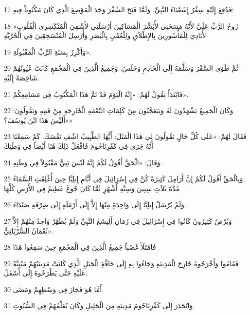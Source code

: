 \par 17 فَدُفِعَ إِلَيْهِ سِفْرُ إِشَعْيَاءَ النَّبِيِّ. وَلَمَّا فَتَحَ السِّفْرَ وَجَدَ الْمَوْضِعَ الَّذِي كَانَ مَكْتُوباً فِيهِ:
\par 18 «رُوحُ الرَّبِّ عَلَيَّ لأَنَّهُ مَسَحَنِي لأُبَشِّرَ الْمَسَاكِينَ أَرْسَلَنِي لأَشْفِيَ الْمُنْكَسِرِي الْقُلُوبِ لأُنَادِيَ لِلْمَأْسُورِينَ بِالإِطْلاَقِ ولِلْعُمْيِ بِالْبَصَرِ وَأُرْسِلَ الْمُنْسَحِقِينَ فِي الْحُرِّيَّةِ
\par 19 وَأَكْرِزَ بِسَنَةِ الرَّبِّ الْمَقْبُولَةِ».
\par 20 ثُمَّ طَوَى السِّفْرَ وَسَلَّمَهُ إِلَى الْخَادِمِ وَجَلَسَ. وَجَمِيعُ الَّذِينَ فِي الْمَجْمَعِ كَانَتْ عُيُونُهُمْ شَاخِصَةً إِلَيْهِ.
\par 21 فَابْتَدَأَ يَقُولُ لَهُمْ: «إِنَّهُ الْيَوْمَ قَدْ تَمَّ هَذَا الْمَكْتُوبُ فِي مَسَامِعِكُمْ».
\par 22 وَكَانَ الْجَمِيعُ يَشْهَدُونَ لَهُ وَيَتَعَجَّبُونَ مِنْ كَلِمَاتِ النِّعْمَةِ الْخَارِجَةِ مِنْ فَمِهِ وَيَقُولُونَ: «أَلَيْسَ هَذَا ابْنَ يُوسُفَ؟»
\par 23 فَقَالَ لَهُمْ: «عَلَى كُلِّ حَالٍ تَقُولُونَ لِي هَذَا الْمَثَلَ: أَيُّهَا الطَّبِيبُ اشْفِ نَفْسَكَ. كَمْ سَمِعْنَا أَنَّهُ جَرَى فِي كَفْرِنَاحُومَ فَافْعَلْ ذَلِكَ هُنَا أَيْضاً فِي وَطَنِكَ
\par 24 وَقَالَ: «الْحَقَّ أَقُولُ لَكُمْ إِنَّهُ لَيْسَ نَبِيٌّ مَقْبُولاً فِي وَطَنِهِ.
\par 25 وَبِالْحَقِّ أَقُولُ لَكُمْ إِنَّ أَرَامِلَ كَثِيرَةً كُنَّ فِي إِسْرَائِيلَ فِي أَيَّامِ إِيلِيَّا حِينَ أُغْلِقَتِ السَّمَاءُ مُدَّةَ ثَلاَثِ سِنِينَ وَسِتَّةِ أَشْهُرٍ لَمَّا كَانَ جُوعٌ عَظِيمٌ فِي الأَرْضِ كُلِّهَا
\par 26 وَلَمْ يُرْسَلْ إِيلِيَّا إِلَى وَاحِدَةٍ مِنْهَا إِلاَّ إِلَى أَرْمَلَةٍ إِلَى صِرْفَةِ صَيْدَاءَ.
\par 27 وَبُرْصٌ كَثِيرُونَ كَانُوا فِي إِسْرَائِيلَ فِي زَمَانِ أَلِيشَعَ النَّبِيِّ وَلَمْ يُطَهَّرْ وَاحِدٌ مِنْهُمْ إِلاَّ نُعْمَانُ السُّرْيَانِيُّ».
\par 28 فَامْتَلَأَ غَضَباً جَمِيعُ الَّذِينَ فِي الْمَجْمَعِ حِينَ سَمِعُوا هَذَا
\par 29 فَقَامُوا وَأَخْرَجُوهُ خَارِجَ الْمَدِينَةِ وَجَاءُوا بِهِ إِلَى حَافَّةَِ الْجَبَلِ الَّذِي كَانَتْ مَدِينَتُهُمْ مَبْنِيَّةً عَلَيْهِ حَتَّى يَطْرَحُوهُ إِلَى أَسْفَلُ.
\par 30 أَمَّا هُوَ فَجَازَ فِي وَسْطِهِمْ وَمَضَى.
\par 31 وَانْحَدَرَ إِلَى كَفْرِنَاحُومَ مَدِينَةٍ مِنَ الْجَلِيلِ وَكَانَ يُعَلِّمُهُمْ فِي السُّبُوتِ.
